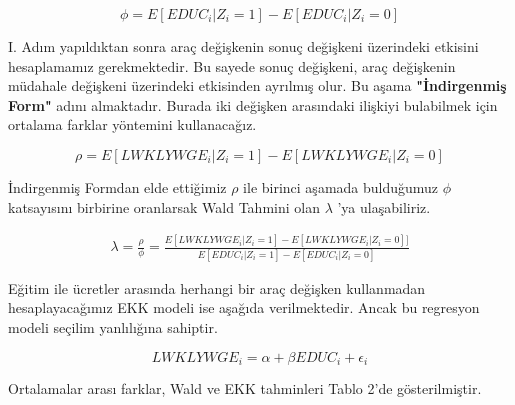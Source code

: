 \documentclass[12pt, a4paper, showtrims]{article}
\begin{document}
\begin{justify}
\begin{justify}
    \[\phi = E [EDUC_i | Z_i = 1] - E[EDUC_i | Z_i = 0 ]\]

    I. Adım yapıldıktan sonra araç değişkenin sonuç değişkeni üzerindeki etkisini hesaplamamız gerekmektedir.
    Bu sayede sonuç değişkeni, araç değişkenin müdahale değişkeni üzerindeki etkisinden ayrılmış olur.
    Bu aşama \textbf{"İndirgenmiş Form"} adını almaktadır. Burada iki değişken arasındaki ilişkiyi bulabilmek için 
    ortalama farklar yöntemini kullanacağız.

    \[\rho  = E [LWKLYWGE_i | Z_i = 1] - E[LWKLYWGE_i | Z_i = 0 ]\]

    İndirgenmiş Formdan elde ettiğimiz $\rho$ ile birinci aşamada bulduğumuz $\phi$ katsayısını birbirine oranlarsak 
    Wald Tahmini olan $\lambda$ 'ya ulaşabiliriz.

    \begin{equation} 
        \begin{split}
        \lambda  = \frac{\rho}{\phi} 
        = \frac{E [LWKLYWGE_i | Z_i = 1] - E[LWKLYWGE_i | Z_i = 0 ]]}{E [EDUC_i | Z_i = 1] - E[EDUC_i | Z_i = 0 ]} 
        \end{split}
    \end{equation}

    Eğitim ile ücretler arasında herhangi bir araç değişken kullanmadan hesaplayacağımız EKK modeli ise aşağıda verilmektedir.
    Ancak bu regresyon modeli seçilim yanlılığına sahiptir. 

    \[ LWKLYWGE_i = \alpha + \beta EDUC_i + \epsilon_i  \]

    \newpage
    Ortalamalar arası farklar, Wald ve EKK tahminleri Tablo 2'de gösterilmiştir.


\end{justify}
\end{justify}
\end{document}
